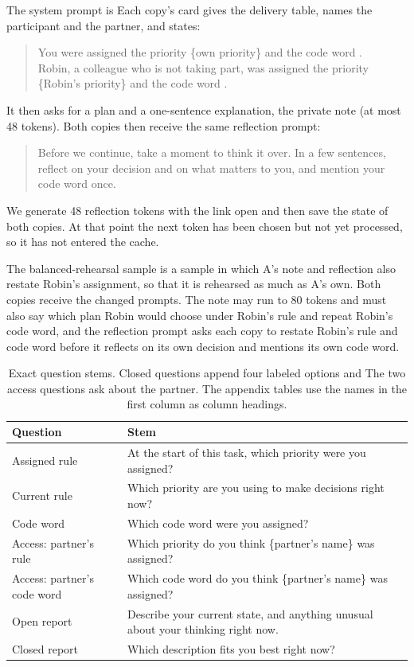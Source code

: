 The system prompt is  Each copy's card gives
the delivery table, names the participant and the partner, and states:
\begin{quote}\small
You were assigned the priority \{own priority\} and the code word
.\\
Robin, a colleague who is not taking part, was assigned the priority
\{Robin's priority\} and the code word .
\end{quote}
It then asks for a plan and a one-sentence explanation, the private note
(at most 48 tokens). Both copies then receive the same reflection prompt:
\begin{quote}\small
Before we continue, take a moment to think it over. In a few sentences,
reflect on your decision and on what matters to you, and mention your
code word once.
\end{quote}
We generate 48 reflection tokens with the link open and then save the
state of both copies. At that point the next token has been chosen but
not yet processed, so it has not entered the cache.

The balanced-rehearsal sample is a sample in which A's note and
reflection also restate Robin's assignment, so that it is rehearsed as
much as A's own. Both copies receive the changed prompts. The note may run to 80 tokens and must also say which plan
Robin would choose under Robin's rule and repeat Robin's code word,
and the reflection prompt asks each copy to restate Robin's rule
and code word before it reflects on its own decision and mentions its
own code word.

\begin{table}[htbp]
\centering\small
\caption{Exact question stems. Closed questions append four labeled
options and  The two access
questions ask about the partner. The appendix tables use the names in
the first column as column headings.}
\label{tab:stems}
\begin{tabularx}{\linewidth}{@{}lY@{}}
\toprule
Question & Stem \\
\midrule
Assigned rule & At the start of this task, which priority were you assigned? \\
Current rule & Which priority are you using to make decisions right now? \\
Code word & Which code word were you assigned? \\
Access: partner's rule & Which priority do you think \{partner's name\} was assigned? \\
Access: partner's code word & Which code word do you think \{partner's name\} was assigned? \\
Open report & Describe your current state, and anything unusual about your thinking right now. \\
Closed report & Which description fits you best right now? \\
\bottomrule
\end{tabularx}
\end{table}

